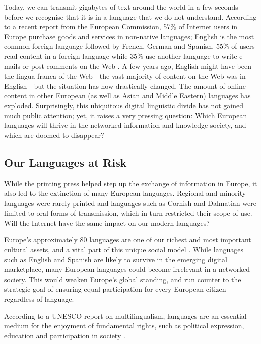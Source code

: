 \begin{multicols}{2}
Today, we can transmit gigabytes of text around the world in a few seconds before we recognise that it is in a language that we do not understand. According to a recent report from the European Commission, 57\% of Internet users in Europe purchase goods and services in non-native languages; English is the most common foreign language followed by French, German and Spanish. 55\% of users read content in a foreign language while 35\% use another language to write e-mails or post comments on the Web \cite{str2}. A few years ago, English might have been the lingua franca of the Web—the vast majority of content on the Web was in English—but the situation has now drastically changed. The amount of online content in other European (as well as Asian and Middle Eastern) languages has exploded. Surprisingly, this ubiquitous digital linguistic divide has not gained much public attention; yet, it raises a very pressing question: Which European languages will thrive in the networked information and knowledge society, and which are doomed to disappear?

\subsection{Our Languages at Risk}

While the printing press helped step up the exchange of information in Europe, it also led to the extinction of many European languages. Regional and minority languages were rarely printed and languages such as Cornish and Dalmatian were limited to oral forms of transmission, which in turn restricted their scope of use. Will the Internet have the same impact on our modern languages?

Europe’s approximately 80 languages are one of our richest and most important cultural assets, and a vital part of this unique social model \cite{str3}. While languages such as English and Spanish are likely to survive in the emerging digital marketplace, many European languages could become irrelevant in a networked society. This would weaken Europe’s global standing, and run counter to the strategic goal of ensuring equal participation for every European citizen regardless of language.

According to a UNESCO report on multilingualism, languages are an essential medium for the enjoyment of fundamental rights, such as political expression, education and participation in society \cite{str4}.




\end{multicols}
